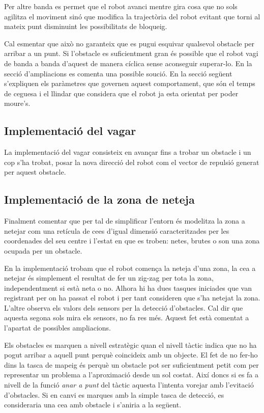Per altre banda es permet que el robot avanci mentre gira cosa que no sols
agilitza el moviment sinó que modifica la trajectòria del robot evitant que
torni al mateix punt disminuint les possibilitats de bloqueig.

Cal esmentar que això no garanteix que es pugui esquivar qualsevol obstacle per
arribar a un punt. Si l'obstacle es suficientment gran és possible que el robot
vagi de banda a banda d'aquest de manera cíclica sense aconseguir superar-lo.
En la secció d'ampliacions es comenta una possible so\lgem ució. En
la secció següent s'expliquen els paràmetres que governen aquest comportament,
que són el temps
de ceguesa i el llindar que considera que el robot ja esta orientat per poder moure's.

\subsection{Implementació del vagar}

La implementació del vagar consisteix en avançar fins a trobar un obstacle i un
cop s'ha trobat, posar la nova direcció del robot com el vector de repulsió
generat per aquest obstacle.

\subsection{Implementació de la zona de neteja}

Finalment comentar que per tal de simplificar l'entorn és modelitza la zona a netejar com una retícula
de ce\lgem es d'igual dimensió caracteritzades per les coordenades del seu
centre
i l'estat en que es troben: netes, brutes o son una zona ocupada per un
obstacle.

En la implementació trobam que el robot comença la neteja d'una zona, la ce\lgem a a netejar és simplement
el resultat de fer un zig-zag per tota la zona, independentment si està neta o
no. Alhora hi ha dues tasques iniciades que van registrant per on ha passat el
robot i per tant consideren que s'ha netejat la zona. L'altre
observa els valors dels sensors per la detecció d'obstacles. Cal dir que aquesta
segona sols mira els sensors, no fa res més. Aquest fet està comentat a
l'apartat de possibles ampliacions.

Els obstacles es marquen a nivell estratègic quan el nivell tàctic indica que no ha pogut arribar a aquell
punt perquè coincideix amb un objecte. El fet de no fer-ho dins la tasca de mapeig és perquè un obstacle
pot ser suficientment petit com per representar un problema a l'aproximació
desde un sol costat. Així doncs si es fa a nivell de la funció \emph{anar a
punt} del tàctic aquesta l'intenta vorejar amb l'evitació d'obstacles. 
Si en canvi es marques amb la simple tasca de detecció, es consideraria una
ce\lgem a amb obstacle i s'aniria a la següent.

